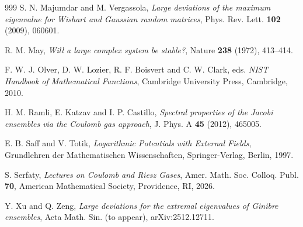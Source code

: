 \documentclass{amsart}
\theoremstyle{plain}
\theoremstyle{remark}
\numberwithin{equation}{section}
\begin{document}
\begin{thebibliography}{999}
 S. N. Majumdar and M. Vergassola, \emph{Large deviations of the maximum eigenvalue for Wishart and Gaussian random matrices}, Phys. Rev. Lett. \textbf{102} (2009), 060601.

 R. M. May, \emph{Will a large complex system be stable?}, Nature \textbf{238} (1972), 413--414.

  F. W. J. Olver, D. W. Lozier, R. F. Boisvert and C. W. Clark, eds. \emph{NIST Handbook of Mathematical Functions}, Cambridge University Press, Cambridge, 2010.


 H. M. Ramli, E. Katzav and I. P. Castillo, \emph{Spectral properties of the Jacobi ensembles via the Coulomb gas approach}, J. Phys. A \textbf{45} (2012), 465005.


 E. B. Saff and V. Totik, \emph{Logarithmic Potentials with External Fields}, Grundlehren der Mathematischen Wissenschaften, Springer-Verlag, Berlin, 1997.

 S. Serfaty, \emph{Lectures on Coulomb and Riesz Gases}, Amer. Math. Soc. Colloq. Publ. \textbf{70},
American Mathematical Society, Providence, RI, 2026.

 Y. Xu and Q. Zeng, \emph{Large deviations for the extremal eigenvalues of Ginibre ensembles}, Acta Math. Sin. (to appear), arXiv:2512.12711. 

\end{thebibliography}
\end{document}
